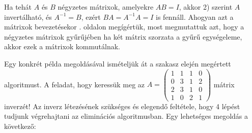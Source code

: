\documentclass[9pt, a4paper, showtrims]{memoir}
\theoremstyle{plain}
\theoremstyle{remark}
\theoremstyle{definition}
\begin{document}
Ha tehát $A$ és $B$ négyzetes mátrixok, amelyekre $AB=I$,
akkor 2) szerint $A$ invertálható, és $A^{-1}=B$, ezért
$BA=A^{-1}A=I$ is fennáll.
Ahogyan azt a mátrixok bevezetésekor . oldalon megígértük,
most megmutattuk azt, hogy a négyzetes mátrixok gyűrűjében ha két mátrix szorzata a gyűrű
egységeleme, akkor ezek a mátrixok kommutálnak.

Egy konkrét példa megoldásával ismételjük át a szakasz elején megértett algoritmust.
A feladat, hogy keressük meg az
\(
A=
\begin{pmatrix}
	1 & 1 & 1 & 0 \\
	0 & 3 & 1 & 2 \\
	2 & 3 & 1 & 0 \\
	1 & 0 & 2 & 1
\end{pmatrix}
\)
mátrix inverzét!
Az inverz létezésének szükséges és elegendő feltétele, hogy 4 lépést tudjunk végrehajtani az eliminációs algoritmusban.
Egy lehetséges megoldás a következő:
\end{document}
